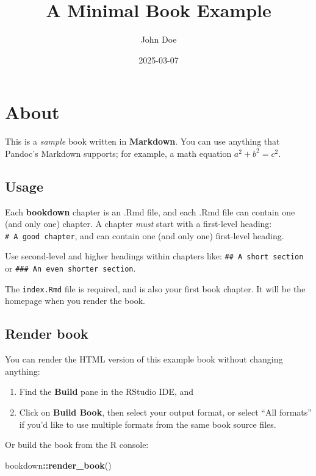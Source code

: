 \documentclass[
]{book}
\title{A Minimal Book Example}
\author{John Doe}
\date{2025-03-07}
\newenvironment{Shaded}{\begin{snugshade}}{\end{snugshade}}
\newcommand{\FunctionTok}[1]{\textcolor[rgb]{0.13,0.29,0.53}{\textbf{#1}}}
\newcommand{\NormalTok}[1]{#1}
\newcommand{\SpecialCharTok}[1]{\textcolor[rgb]{0.81,0.36,0.00}{\textbf{#1}}}
\begin{document}
\maketitle

{
\setcounter{tocdepth}{1}
\tableofcontents
}
\chapter{About}\label{about}

This is a \emph{sample} book written in \textbf{Markdown}. You can use anything that Pandoc's Markdown supports; for example, a math equation \(a^2 + b^2 = c^2\).

\section{Usage}\label{usage}

Each \textbf{bookdown} chapter is an .Rmd file, and each .Rmd file can contain one (and only one) chapter. A chapter \emph{must} start with a first-level heading: \texttt{\#\ A\ good\ chapter}, and can contain one (and only one) first-level heading.

Use second-level and higher headings within chapters like: \texttt{\#\#\ A\ short\ section} or \texttt{\#\#\#\ An\ even\ shorter\ section}.

The \texttt{index.Rmd} file is required, and is also your first book chapter. It will be the homepage when you render the book.

\section{Render book}\label{render-book}

You can render the HTML version of this example book without changing anything:

\begin{enumerate}
\def\labelenumi{\arabic{enumi}.}
\item
  Find the \textbf{Build} pane in the RStudio IDE, and
\item
  Click on \textbf{Build Book}, then select your output format, or select ``All formats'' if you'd like to use multiple formats from the same book source files.
\end{enumerate}

Or build the book from the R console:

\begin{Shaded}
\begin{Highlighting}[]
\NormalTok{bookdown}\SpecialCharTok{::}\FunctionTok{render\_book}\NormalTok{()}
\end{Highlighting}
\end{Shaded}
\end{document}
